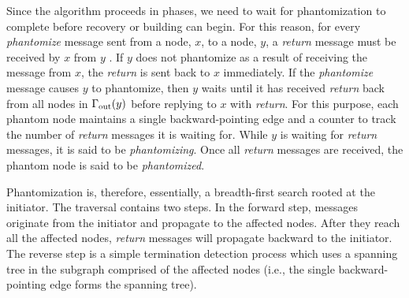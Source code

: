 Since the algorithm proceeds in phases, we need to wait for phantomization to complete before recovery or building can begin. For this reason,
for every \emph{phantomize} message sent from a node, $x$, to a node, $y$, a {\em return} message must be received by $x$ from $y$ . If
$y$ does not phantomize as a result of receiving the message from $x$, the {\em return}
is sent back to $x$ immediately. If the {\em phantomize} message causes $y$ to phantomize,
then $y$ waits until it has received {\em return} back from all nodes in $\Gamma_{\rm out}(y)$ before
replying to $x$ with {\em return}.
For this purpose, each phantom node maintains %
a single backward-pointing edge and a counter to track the number of {\em return} messages it is
waiting for. While $y$ is waiting for {\em return} messages, it is said to be {\em phantomizing}. Once
all \emph{return} messages are received, the phantom node is said to be {\em phantomized}.



Phantomization is, therefore, essentially, a breadth-first search
rooted at the initiator.
The traversal contains two steps. In the forward
step, messages originate from the initiator and propagate to the affected nodes.
After they reach all the affected nodes,
\emph{return} messages will propagate backward to the initiator.
The reverse step is
a simple termination detection process which uses
a spanning tree in the subgraph comprised of the affected nodes (i.e., the single
backward-pointing edge forms the spanning tree).

